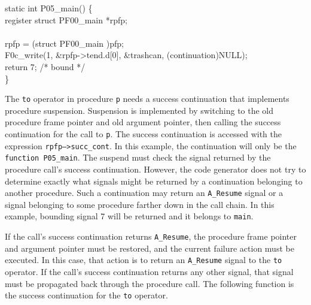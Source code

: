 \goodbreak
\begin{iconcode}
static int P05\_main() \{\\
\>register struct PF00\_main *rpfp;\\
\\
\>rpfp = (struct PF00\_main )pfp;\\
\>F0c\_write(1, \&rpfp->tend.d[0], \&trashcan, (continuation)NULL);\\
\>return 7; /* bound */\\
\}\\
\end{iconcode}

\noindent
The \texttt{to} operator in procedure \texttt{p} needs a success
continuation that implements procedure suspension. Suspension is
implemented by switching to the old procedure frame pointer and old
argument pointer, then calling the success continuation for the call
to \texttt{p}. The success continuation is accessed with the
expression \texttt{rpfp--{\textgreater}succ\_cont}.  In this example,
the continuation will only be the \texttt{function P05\_main}. The
suspend must check the signal returned by the procedure call's success
continuation. However, the code generator does not try to determine
exactly what signals might be returned by a continuation belonging to
another procedure. Such a continuation may return an
\texttt{A\_Resume} signal or a signal belonging to some procedure
farther down in the call chain. In this example, bounding signal 7
will be returned and it belongs to \texttt{main}.

If the call's success continuation returns \texttt{A\_Resume}, the procedure
frame pointer and argument pointer must be restored, and the current
failure action must be executed. In this case, that action is to
return an \texttt{A\_Resume} signal to the \texttt{to} operator. If the call's success
continuation returns any other signal, that signal must be propagated
back through the procedure call. The following function is the success
continuation for the \texttt{to} operator.

